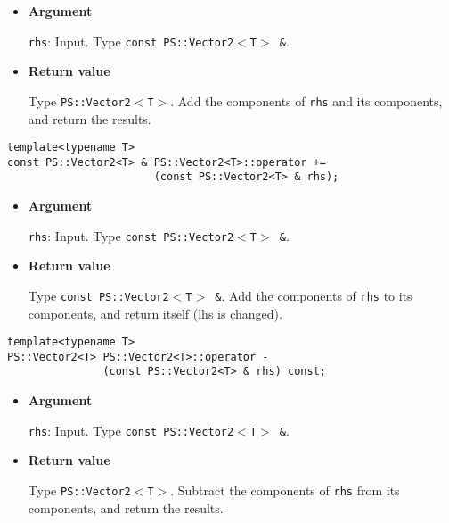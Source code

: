 \begin{itemize}

\item{{\bf Argument}}

\texttt{rhs}: Input. Type \texttt{const PS::Vector2$<$T$>$ \&}.

\item{{\bf Return value}}

Type \texttt{PS::Vector2$<$T$>$}. Add the components of \texttt{rhs} and its
components, and return the results.

\end{itemize}

\begin{screen}
\begin{verbatim}
template<typename T>
const PS::Vector2<T> & PS::Vector2<T>::operator += 
                       (const PS::Vector2<T> & rhs);
\end{verbatim}
\end{screen}

\begin{itemize}

\item{{\bf Argument}}

\texttt{rhs}: Input. Type \texttt{const PS::Vector2$<$T$>$ \&}.

\item{{\bf Return value}}

Type \texttt{const PS::Vector2$<$T$>$ \&}. Add the components of \texttt{rhs} to its
components, and return itself (lhs is changed).

\end{itemize}

\begin{screen}
\begin{verbatim}
template<typename T>
PS::Vector2<T> PS::Vector2<T>::operator - 
               (const PS::Vector2<T> & rhs) const;
\end{verbatim}
\end{screen}

\begin{itemize}

\item{{\bf Argument}}

\texttt{rhs}: Input. Type \texttt{const PS::Vector2$<$T$>$ \&}.

\item{{\bf Return value}}

Type \texttt{PS::Vector2$<$T$>$}. Subtract the components of \texttt{rhs} from its
components, and return the results.

\end{itemize}

